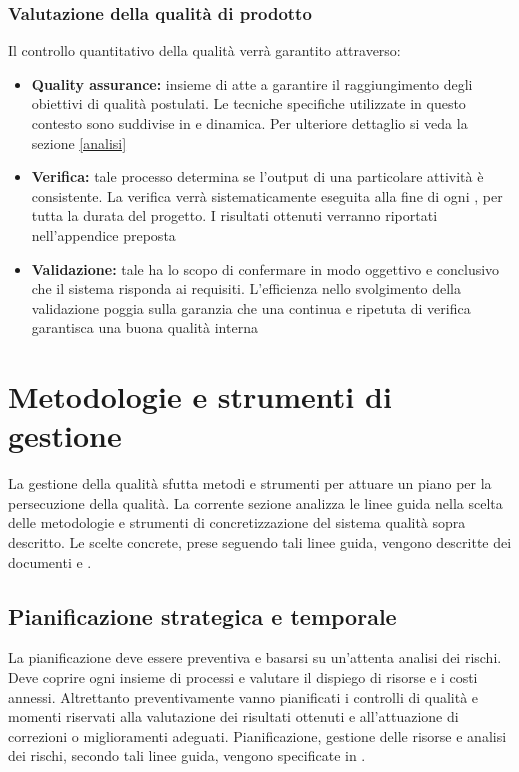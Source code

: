 \documentclass[12pt,a4paper]{article}
\begin{document}
	\subsubsection{Valutazione della qualità di prodotto}
	\label{sec:procedure-di-controllo-di-qualità-di-prodotto}
	Il controllo quantitativo della qualità verrà garantito attraverso:
	
	\begin{itemize}
		\item \textbf{Quality assurance:} insieme di  atte a garantire il raggiungimento degli obiettivi di qualità postulati. Le tecniche specifiche utilizzate in questo contesto sono suddivise in  e dinamica. Per ulteriore dettaglio si veda la sezione \ref{analisi}
		\item \textbf{Verifica:} tale processo determina se l'output di una particolare attività è consistente. La verifica verrà sistematicamente eseguita alla fine di ogni , per tutta la durata del progetto. I risultati ottenuti verranno riportati nell'appendice preposta
		\item \textbf{Validazione:} tale   ha lo scopo di confermare in modo oggettivo e conclusivo che il sistema risponda ai requisiti. L'efficienza nello svolgimento della validazione poggia sulla garanzia che una continua e ripetuta  di verifica garantisca una buona qualità interna
	\end{itemize}
	
	\newpage
	\section{Metodologie e strumenti di gestione} \label{gest_qual}
	
	La gestione della qualità sfutta metodi e strumenti per attuare un piano per la  persecuzione della qualità. 
	 La corrente sezione analizza le linee guida nella scelta delle metodologie e strumenti di concretizzazione del sistema qualità sopra descritto. Le scelte concrete, prese seguendo tali linee guida, vengono descritte dei documenti \PdP{} e \NdP{}.
	
	\subsection{Pianificazione strategica e temporale}
	La pianificazione deve essere preventiva e basarsi su un'attenta analisi dei rischi. Deve coprire ogni insieme di processi e valutare il dispiego di risorse e i costi annessi. Altrettanto preventivamente vanno pianificati i controlli di qualità e momenti riservati alla valutazione dei risultati ottenuti e all'attuazione di correzioni o miglioramenti adeguati.
	Pianificazione, gestione delle risorse e analisi dei rischi, secondo tali linee guida, vengono specificate in \PdP{}.
		
\end{document}
